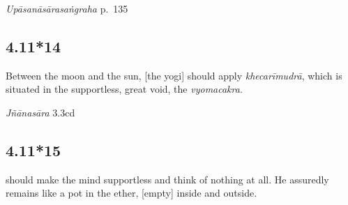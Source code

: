 \begin{ekdosis}

\begin{testimonia}[hp04_011_13]
\emph{Upāsanāsārasaṅgraha} p.~135
\begin{versinnote}
\end{versinnote}
\end{testimonia}


\subsection*{4.11*14}
\begin{translation}[hp04_011_14]
Between the moon and the sun, [the yogi] should apply \emph{khecarīmudrā}, which is situated in the supportless, great void, the \emph{vyomacakra}.
\end{translation}

\begin{sources}[hp04_011_14]
\emph{Jñānasāra} 3.3cd
\begin{versinnote}
\end{versinnote}

\end{sources}



\subsection*{4.11*15}
\begin{translation} should make the mind supportless and think of nothing at all. He assuredly remains like a pot in the ether, [empty] inside and outside.
\end{translation}


\end{ekdosis}
